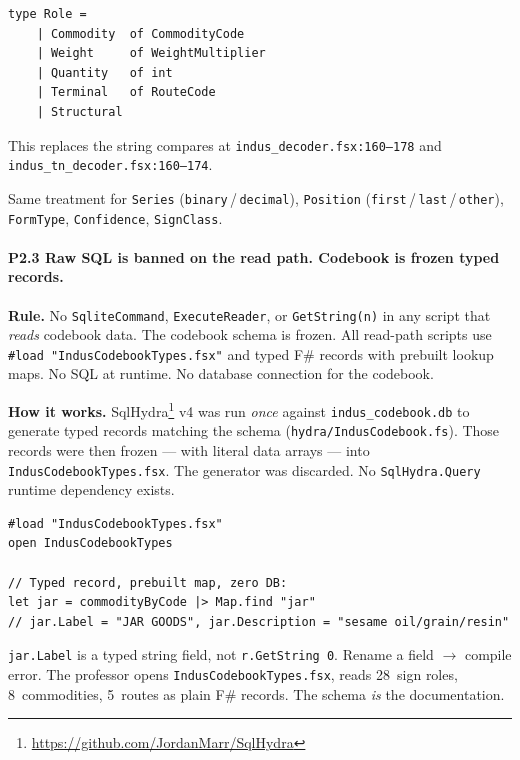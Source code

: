 \documentclass[11pt]{article}
\begin{document}
\begin{Verbatim}[fontsize=\small,frame=single]
type Role =
    | Commodity  of CommodityCode
    | Weight     of WeightMultiplier
    | Quantity   of int
    | Terminal   of RouteCode
    | Structural
\end{Verbatim}

This replaces the string compares at
\texttt{indus\_decoder.fsx:160--178} and
\texttt{indus\_tn\_decoder.fsx:160--174}.

Same treatment for \texttt{Series}
(\texttt{binary}\,/\,\texttt{decimal}), \texttt{Position}
(\texttt{first}\,/\,\texttt{last}\,/\,\texttt{other}),
\texttt{FormType}, \texttt{Confidence}, \texttt{SignClass}.

\paragraph{P2.3 Raw SQL is banned on the read path.  Codebook is frozen typed records.}

\textbf{Rule.}  No \texttt{SqliteCommand}, \texttt{ExecuteReader},
or \texttt{GetString(n)} in any script that \emph{reads} codebook
data.  The codebook schema is frozen.  All read-path scripts use
\texttt{\#load "IndusCodebookTypes.fsx"} and typed F\# records
with prebuilt lookup maps.  No SQL at runtime.  No database
connection for the codebook.

\textbf{How it works.}
SqlHydra\footnote{\url{https://github.com/JordanMarr/SqlHydra}}
v4 was run \emph{once} against \texttt{indus\_codebook.db} to
generate typed records matching the schema
(\texttt{hydra/IndusCodebook.fs}).  Those records were then frozen
--- with literal data arrays --- into
\texttt{IndusCodebookTypes.fsx}.  The generator was discarded.
No \texttt{SqlHydra.Query} runtime dependency exists.

\begin{Verbatim}[fontsize=\small,frame=single]
#load "IndusCodebookTypes.fsx"
open IndusCodebookTypes

// Typed record, prebuilt map, zero DB:
let jar = commodityByCode |> Map.find "jar"
// jar.Label = "JAR GOODS", jar.Description = "sesame oil/grain/resin"
\end{Verbatim}

\texttt{jar.Label} is a typed string field, not
\texttt{r.GetString 0}.  Rename a field $\to$ compile error.
The professor opens \texttt{IndusCodebookTypes.fsx}, reads
28~sign roles, 8~commodities, 5~routes as plain F\# records.
The schema \emph{is} the documentation.
\end{document}
